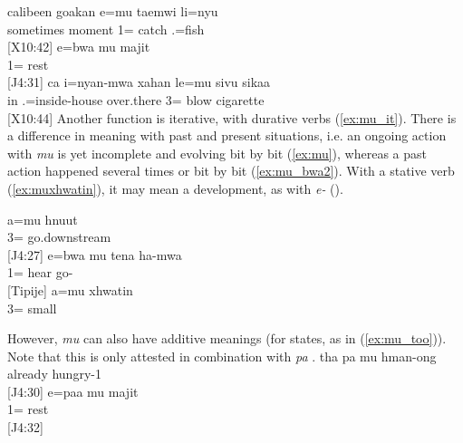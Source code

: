  \ea\label{ex:mu_taemwi}
 \gll calibeen goakan e=mu taemwi li=nyu \\
  sometimes moment 1= catch .=fish\\
 \glt {} {[X10:42]}
 \ex\label{ex:mu_bwa1}
 \gll e=bwa mu majit\\
  1=  rest\\
 \glt {} {[J4:31]}
 \ex\label{ex:muoften1}
 \gll ca i=nyan-mwa xahan le=mu sivu sikaa \\
  in .=inside-house  over.there 3= blow cigarette \\
 \glt {} {[X10:44]}
 \z
 Another function is iterative, with durative verbs (\ref{ex:mu_it}). There is a difference in meaning with past and present situations, i.e. an ongoing action with \textit{mu} is yet incomplete and evolving bit by bit (\ref{ex:mu}), whereas a past action happened several times or bit by bit (\ref{ex:mu_bwa2}). With a stative verb (\ref{ex:muxhwatin}), it may mean a development, as with \textit{e-}  ().
 
 \ea\label{ex:mu}\label{ex:mu_it}

 \gll a=mu hnuut\\
  3= go.downstream\\
 \glt {} {[J4:27]}
 \ex\label{ex:mu_bwa2}
 \gll e=bwa mu tena ha-mwa\\
  1=  hear go-\\
 \glt {} {[Tipije]}
 \ex \label{ex:muxhwatin}
 \gll 	a=mu xhwatin	\\
 	3= small	\\
 \glt	{}	
 \z
  
However, \textit{mu} can also have additive meanings (for states, as in (\ref{ex:mu_too})). Note that this is only attested in combination with \textit{pa} .\largerpage
	\ea\label{ex:mu_too}\label{ex:mu_add}
	\gll tha pa mu hman-ong\\
	  already  hungry-1\\
	\glt {} {[J4:30]}
	\ex\label{ex:mu_as-well}
	\gll e=paa mu majit\\
	 1=  rest\\
	\glt {} {[J4:32]}
	\z

